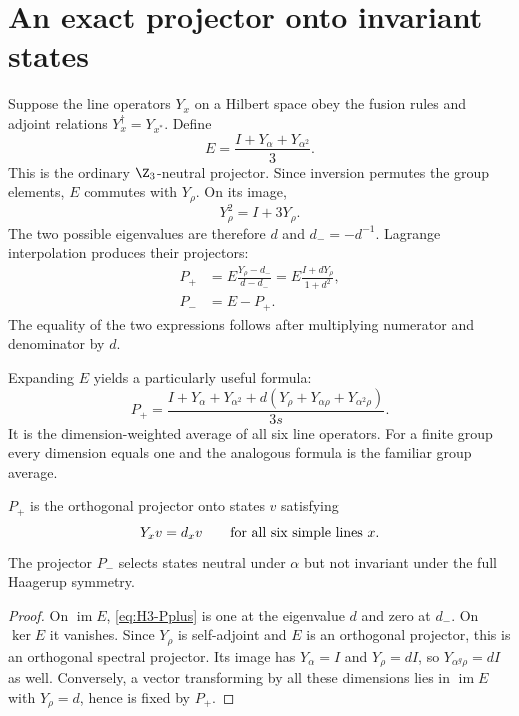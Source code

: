 \section{An exact projector onto invariant states}

Suppose the line operators $Y_x$ on a Hilbert space obey the fusion
rules and adjoint relations $Y_x^\dagger=Y_{x^*}$. Define
\begin{equation}
 E=\frac{I+Y_\alpha+Y_{\alpha^2}}3.
 \label{eq:H3-neutral-projector}
\end{equation}
This is the ordinary $\Z_3$-neutral projector.  Since inversion
permutes the group elements, $E$ commutes with $Y_\rho$.  On its
image,
\[
 Y_\rho^2=I+3Y_\rho.
\]
The two possible eigenvalues are therefore $d$ and $d_-=-d^{-1}$.
Lagrange interpolation produces their projectors:
\begin{align}
 P_+&=E\frac{Y_\rho-d_-}{d-d_-}
 =E\frac{I+dY_\rho}{1+d^2},\label{eq:H3-Pplus}\\
 P_-&=E-P_+.
\end{align}
The equality of the two expressions follows after multiplying
numerator and denominator by $d$.

Expanding $E$ yields a particularly useful formula:
\begin{equation}
 P_+=\frac{
 I+Y_\alpha+Y_{\alpha^2}
 +d(Y_\rho+Y_{\alpha\rho}+Y_{\alpha^2\rho})}{3s}.
 \label{eq:H3-dimension-projector}
\end{equation}
It is the dimension-weighted average of all six line operators.
For a finite group every dimension equals one and the analogous
formula is the familiar group average.

\begin{proposition}
$P_+$ is the orthogonal projector onto states $v$ satisfying
\[
 Y_xv=d_xv\qquad\hbox{for all six simple lines }x.
\]
The projector $P_-$ selects states neutral under $\alpha$ but not
invariant under the full Haagerup symmetry.
\end{proposition}
\begin{proof}
On $\operatorname{im}E$, \eqref{eq:H3-Pplus} is one at the
eigenvalue $d$ and zero at $d_-$.  On $\ker E$ it vanishes.
Since $Y_\rho$ is self-adjoint and $E$ is an orthogonal projector,
this is an orthogonal spectral projector.  Its image has
$Y_\alpha=I$ and $Y_\rho=dI$, so
$Y_{\alpha^g\rho}=dI$ as well.  Conversely, a vector transforming
by all these dimensions lies in $\operatorname{im}E$ with
$Y_\rho=d$, hence is fixed by $P_+$.
\end{proof}

